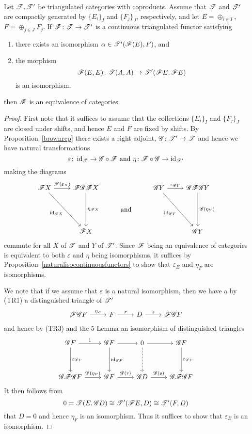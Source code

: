 \documentclass[dissertation.tex]{subfiles}
\begin{document}
\begin{cor}\label{fullyfaithfulongensisequivalence}
  Let $\mathscr{T}, \mathscr{T}^\prime$ be triangulated categories with coproducts.
  Assume that $\mathscr{T}$ and $\mathscr{T}^\prime$ are compactly generated by $\{E_i\}_I$ and $\{F_j\}_J$, respectively, and let $E = \oplus_{i \in I}$, $F = \oplus_{j \in J} F_j$.
  If $\mathscr{F} \colon \mathscr{T} \to \mathscr{T}^\prime$ is a continuous triangulated functor satisfying
  \begin{enumerate}
  \item
    there exists an isomorphism $\alpha \in \mathscr{T}^\prime(\mathscr{F}(E), F)$, and
  \item
    the morphism
    $$\mathscr{F}(E,E) \colon \mathscr{T}(A,A) \to \mathscr{T}^\prime(\mathscr{F} E, \mathscr{F} E)$$
    is an isomorphism,
  \end{enumerate}
  then $\mathscr{F}$ is an equivalence of categories.

  \begin{proof}
    First note that it suffices to assume that the collections $\{E_i\}_I$ and $\{F_j\}_J$ are closed under shifts, and hence $E$ and $F$ are fixed by shifts.
    By Proposition~\ref{brownrep} there exists a right adjoint, $\mathscr{G} \colon \mathscr{T}^\prime \to \mathscr{T}$ and hence we have natural transformations
    $$\varepsilon \colon \id_{\T} \to \G \circ \F \ \text{and}\ \eta \colon \F \circ \G \to \id_{\T^\prime}$$
    making the diagrams
    $$\begin{tikzcd}
      \F X \arrow[swap]{rdd}{\id_{\F X}}\arrow{r}{\F(\varepsilon_X)}& \F\G\F X\arrow{dd}{\eta_{\F X}} & & \G Y \arrow[swap]{rdd}{\id_{\G Y}}\arrow{r}{\varepsilon_{\G Y}} & \G\F\G Y \arrow{dd}{\G(\eta_Y)}\\
      & & \text{and}\\
      & \F X & && \G Y
    \end{tikzcd}$$
    commute for all $X$ of $\mathscr{T}$ and $Y$ of $\mathscr{T}^\prime$.
    Since $\mathscr{F}$ being an equivalence of categories is equivalent to both $\varepsilon$ and $\eta$ being isomorphisms, it suffices by Proposition~\ref{naturalisocontinuousfunctors} to show that $\varepsilon_E$ and $\eta_F$ are isomorphisms.

    We note that if we assume that $\varepsilon$ is a natural isomorphism, then we have a by (TR1) a distinguished triangle of $\mathscr{T}^\prime$
    $$\begin{tikzcd}
      \F \G F \arrow{r}{\eta_F} & F \arrow{r}{r} & D \arrow{r}{s} & \F\G F
    \end{tikzcd}$$
    and hence by (TR3) and the 5-Lemma an isomorphism of distinguished triangles
    $$\begin{tikzcd}
      \G F \arrow{r}{1}\arrow{dd}{\varepsilon_{\G F}} & \G F \arrow{r}\arrow{dd}{\id_{\G F}} & 0 \arrow{r}\arrow[dashed]{dd} & \G F\arrow{dd}{\varepsilon_{\G F}}\\\\
      \G\F\G F \arrow{r}{\G(\eta_{F})} & \G F \arrow{r}{\G(r)} & \G D \arrow{r}{\G(s)} & \G \F \G F
    \end{tikzcd}$$
    It then follows from
    $$0 = \mathscr{T}(E, \mathscr{G} D) \cong \mathscr{T}^\prime(\mathscr{F} E, D) \cong \mathscr{T}^\prime(F, D)$$
    that $D = 0$ and hence $\eta_F$ is an isomorphism.
    Thus it suffices to show that $\varepsilon_E$ is an isomorphism.
    

\end{proof}
\end{cor}
\end{document}

